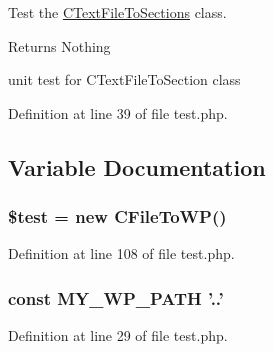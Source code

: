 Test the \hyperlink{class_c_text_file_to_sections}{C\+Text\+File\+To\+Sections} class. 

\begin{DoxyReturn}{Returns}
Nothing
\end{DoxyReturn}
unit test for C\+Text\+File\+To\+Section class 

Definition at line 39 of file test.\+php.



\subsection{Variable Documentation}
\hypertarget{test_8php_a31daebf88fc668f410293e2c70cea3fc}{
\subsubsection[{\$test}]{\setlength{\rightskip}{0pt plus 5cm}\$test = new {\bf C\+File\+To\+W\+P}()}}\label{test_8php_a31daebf88fc668f410293e2c70cea3fc}


Definition at line 108 of file test.\+php.

\hypertarget{test_8php_ab9655ee8f40d51ad76f2479000e8d41c}{
\subsubsection[{M\+Y\+\_\+\+W\+P\+\_\+\+P\+A\+T\+H}]{\setlength{\rightskip}{0pt plus 5cm}const M\+Y\+\_\+\+W\+P\+\_\+\+P\+A\+T\+H '..'}}\label{test_8php_ab9655ee8f40d51ad76f2479000e8d41c}


Definition at line 29 of file test.\+php.

